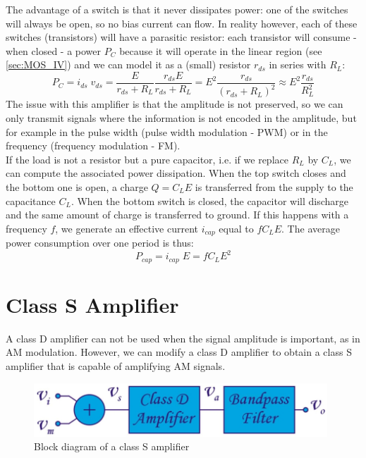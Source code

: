 The advantage of a switch is that it never dissipates power: one of the switches will always be open, so no bias current can flow. In reality however, each of these switches (transistors) will have a parasitic resistor: each transistor will consume - when closed - a power $P_C$ because it will operate in the linear region (see \ref{sec:MOS_IV}) and we can model it as a (small) resistor $r_{ds}$ in series with $R_L$:
$$
P_C = i_{ds} \; v_{ds} = \frac{E}{r_{ds} + R_L} \frac{r_{ds} E}{r_{ds} + R_L} = E^2 \frac{r_{ds}}{(r_{ds} + R_L)^2} \approx E^2 \frac{r_{ds}}{R_L^2}
$$
The issue with this amplifier is that the amplitude is not preserved, so we can only transmit signals where the information is not encoded in the amplitude, but for example in the pulse width (pulse width modulation - PWM) or in the frequency (frequency modulation - FM).\\
If the load is not a resistor but a pure capacitor, i.e. if we replace $R_L$ by $C_L$, we can compute the associated power dissipation. When the top switch closes and the bottom one is open, a charge $Q = C_LE$ is transferred from the supply to the capacitance $C_L$. When the bottom switch is closed, the capacitor will discharge and the same amount of charge is transferred to ground. If this happens with a frequency $f$, we generate an effective current $i_{cap}$ equal to $fC_LE$. The average power consumption over one period is thus:
$$
P_{cap} = i_{cap} \; E = fC_L E^2
$$

\section{Class S Amplifier}
\label{sec:classS}
A class D amplifier can not be used when the signal amplitude is important, as in AM modulation. However, we can modify a class D amplifier to obtain a class S amplifier that is capable of amplifying AM signals.\\
\begin{figure}[h!]
	\centering
	\includegraphics[width=11cm]{figures/ch09/classS1.jpg}
	\caption{Block diagram of a class S amplifier}
	\label{fig:classS1}
\end{figure}

